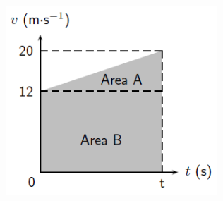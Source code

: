 \begin{enumerate}[noitemsep, label=\textbf{\arabic*}. ]
	\begin{figure}[H] %
    \begin{center}
    \label{m38796*id82326!!!underscore!!!media}\label{m38796*id82326!!!underscore!!!printimage}\includegraphics[width=300px]{col11305.imgs/m38796_PG10C2_054.png} %
        
      \vspace{2pt}
    \vspace{.1in}
    
    \end{center}

 \end{figure}   

    \addtocounter{footnote}{-0}
    

\end{enumerate}
